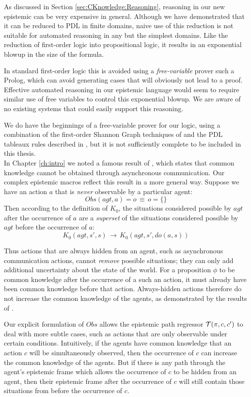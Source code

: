 As discussed in Section \ref{sec:CKnowledge:Reasoning}, reasoning
in our new epistemic can be very expensive in general. Although we
have demonstrated that it can be reduced to PDL in finite domains,
naive use of this reduction is not suitable for automated reasoning
in any but the simplest domains. Like the reduction of first-order
logic into propositional logic, it results in an exponential blowup
in the size of the formula.

In standard first-order logic this is avoided using a \emph{free-variable}
prover such a Prolog, which can avoid generating cases that will obviously
not lead to a proof. Effective automated reasoning in our epistemic
language would seem to require similar use of free variables to control
this exponential blowup. We are aware of no existing systems that
could easily support this reasoning.

We do have the beginnings of a free-variable prover for our logic,
using a combination of the first-order Shannon Graph techniques of
\citep{Posegga95shannong_graphs} and the PDL tableaux rules described
in \citep{abate07twb_pdl}, but it is not sufficiently complete to
be included in this thesis.\\


In Chapter \ref{ch:intro} we noted a famous result of \citet{halpern90knowledge_distrib},
which states that common knowledge cannot be obtained through asynchronous
communication. Our complex epistemic macros reflect this result in
a more general way. Suppose we have an action $a$ that is \emph{never}
observable by a particular agent:\[
Obs(agt,a)=o\,\equiv\, o=\{\}\]
 Then according to the definition of $K_{0}$, the situations considered
possible by $agt$ after the occurrence of $a$ are a \emph{superset}
of the situations considered possible by $agt$ before the occurrence
of $a$:\[
K_{0}(agt,s',s)\,\rightarrow\, K_{0}(agt,s',do(a,s))\]


Thus actions that are always hidden from an agent, such as asynchronous
communication actions, cannot \emph{remove} possible situations; they
can only add additional uncertainty about the state of the world.
For a proposition $\phi$ to be common knowledge after the occurrence
of a such an action, it must already have been common knowledge before
that action. Always-hidden actions therefore do not increase the common
knowledge of the agents, as demonstrated by the results of \citep{halpern90knowledge_distrib}.

Our explicit formulation of $Obs$ allows the epistemic path regressor
$\mathcal{T}(\pi,c,c')$ to deal with more subtle cases, such as actions
that are only observable under certain conditions. Intuitively, if
the agents have common knowledge that an action $c$ will be simultaneously
observed, then the occurrence of $c$ can increase the common knowledge
of the agents. But if there is any path through the agent's epistemic
frame which allows the occurrence of $c$ to be hidden from an agent,
then their epistemic frame after the occurrence of $c$ will still
contain those situations from before the occurrence of $c$.

